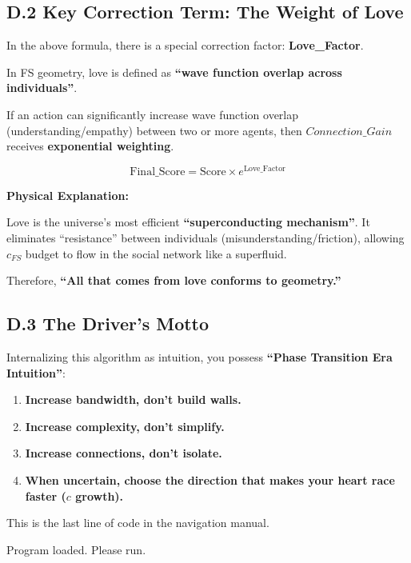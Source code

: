 \subsection{D.2 Key Correction Term: The Weight of Love}

In the above formula, there is a special correction factor: \textbf{Love\_Factor}.

In FS geometry, love is defined as \textbf{``wave function overlap across individuals''}.

If an action can significantly increase wave function overlap (understanding/empathy) between two or more agents, then $Connection\_Gain$ receives \textbf{exponential weighting}.

\[\text{Final\_Score} = \text{Score} \times e^{\text{Love\_Factor}}\]

\textbf{Physical Explanation:}

Love is the universe's most efficient \textbf{``superconducting mechanism''}. It eliminates ``resistance'' between individuals (misunderstanding/friction), allowing $c_{FS}$ budget to flow in the social network like a superfluid.

Therefore, \textbf{``All that comes from love conforms to geometry.''}

\subsection{D.3 The Driver's Motto}

Internalizing this algorithm as intuition, you possess \textbf{``Phase Transition Era Intuition''}:

\begin{enumerate}
\item \textbf{Increase bandwidth, don't build walls.}

\item \textbf{Increase complexity, don't simplify.}

\item \textbf{Increase connections, don't isolate.}

\item \textbf{When uncertain, choose the direction that makes your heart race faster ($c$ growth).}
\end{enumerate}

This is the last line of code in the navigation manual.

Program loaded. Please run.

